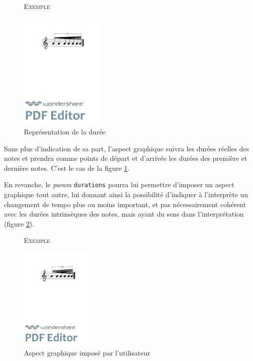 \documentclass{article}
\newenvironment{gmncode}	{\vspace{-2mm}\small\verbatim}{\endverbatim\vspace{-2mm}}
\newcommand{\code}[1]		{{\small \texttt{#1}}}
\newcommand{\exemple}		{\vspace{2mm}\hspace*{-3mm}\textsc{Exemple}}
\begin{document}
\begin{figure}[h]
\exemple
\begin{gmncode}
[ \fBeam<drawDuration="true"> (
    a/8 a a/16 a a a/32 a )]
\end{gmncode}
\begin{center}
\includegraphics[width=40mm]{img/fbeamduree.pdf}
\end{center}
\caption{Représentation de la durée}
\label{fig:fbeamduree}
\end{figure}

Sans plus d'indication de sa part, l'aspect graphique suivra les durées réelles des notes et prendra comme points de départ et d'arrivée les durées des première et dernière notes.  C'est le cas de la figure \ref{fig:fbeamduree}.

En revanche, le \emph{param} \code{durations} pourra lui permettre d'imposer un aspect graphique tout autre, lui donnant ainsi la possibilité d'indiquer à l'interprète un changement de tempo plus ou moins important, et pas nécessairement cohérent avec les durées intrinsèques des notes, mais ayant du sens dans l'interprétation (figure \ref{fig:utilisateur}).

\begin{figure}[h]
\exemple
\begin{gmncode}
[ \fBeam<durations="1/16, 1/64", 
      drawDuration="true">(
    a/8 a/16 a a a/32 a )]
\end{gmncode}
\begin{center}
\includegraphics[width=35mm]{img/durations.pdf}
\end{center}
\caption{Aspect graphique imposé par l'utilisateur}
\label{fig:utilisateur}
\end{figure}
\end{document}
